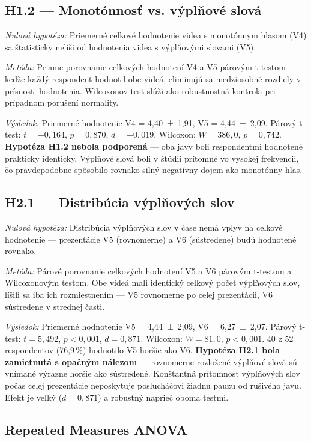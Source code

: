 \subsection{H1.2 --- Monotónnosť vs. výplňové slová}

\textit{Nulová hypotéza:} Priemerné celkové hodnotenie videa s monotónnym hlasom (V4) sa štatisticky nelíši od hodnotenia videa s výplňovými slovami (V5).

\textit{Metóda:} Priame porovnanie celkových hodnotení V4 a V5 párovým t-testom --- keďže každý respondent hodnotil obe videá, eliminujú sa medziosobné rozdiely v prísnosti hodnotenia. Wilcoxonov test slúži ako robustnostná kontrola pri prípadnom porušení normality.

\textit{Výsledok:} Priemerné hodnotenie V4 = 4,40~±~1,91, V5 = 4,44~±~2,09. Párový t-test: $t = -0{,}164$, $p = 0{,}870$, $d = -0{,}019$. Wilcoxon: $W = 386{,}0$, $p = 0{,}742$. \textbf{Hypotéza H1.2 nebola podporená} --- oba javy boli respondentmi hodnotené prakticky identicky. Výplňové slová boli v štúdii prítomné vo vysokej frekvencii, čo pravdepodobne spôsobilo rovnako silný negatívny dojem ako monotónny hlas.

\subsection{H2.1 --- Distribúcia výplňových slov}

\textit{Nulová hypotéza:} Distribúcia výplňových slov v čase nemá vplyv na celkové hodnotenie --- prezentácie V5 (rovnomerne) a V6 (sústredene) budú hodnotené rovnako.

\textit{Metóda:} Párové porovnanie celkových hodnotení V5 a V6 párovým t-testom a Wilcoxonovým testom. Obe videá mali identický celkový počet výplňových slov, líšili sa iba ich rozmiestnením --- V5 rovnomerne po celej prezentácii, V6 sústredene v strednej časti.

\textit{Výsledok:} Priemerné hodnotenie V5 = 4,44~±~2,09, V6 = 6,27~±~2,07. Párový t-test: $t = 5{,}492$, $p < 0{,}001$, $d = 0{,}871$. Wilcoxon: $W = 81{,}0$, $p < 0{,}001$. 40 z 52 respondentov (76,9\,\%) hodnotilo V5 horšie ako V6. \textbf{Hypotéza H2.1 bola zamietnutá s opačným nálezom} --- rovnomerne rozložené výplňové slová sú vnímané výrazne horšie ako sústredené. Konštantná prítomnosť výplňových slov počas celej prezentácie neposkytuje poslucháčovi žiadnu pauzu od rušivého javu. Efekt je veľký ($d = 0{,}871$) a robustný naprieč oboma testmi.

\subsection{Repeated Measures ANOVA}

